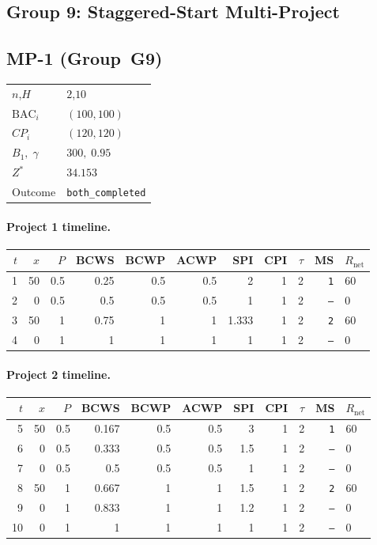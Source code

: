 \documentclass[12pt, a4paper]{article}
\newcommand{\BAC}{\mathrm{BAC}}
\begin{document}
\newpage


\subsection*{Group 9: Staggered-Start Multi-Project}

\subsection*{MP-1  (Group~G9)}
\begin{center}
\begin{tabular}{ll}
\toprule
$n$,\;$H$ & $2$,\;$10$ \\
$\BAC_i$ & $(100, 100)$ \\
$CP_i$   & $(120, 120)$ \\
$B_1,\;\gamma$ & $300,\;0.95$ \\
$Z^*$ & $34.153$ \\
Outcome & \texttt{both_completed} \\
\bottomrule
\end{tabular}
\end{center}

\paragraph{Project 1 timeline.}
\begin{center}
\begin{tabular}{rrrrrrrrrrl}
\toprule
$t$ & $x$ & $P$ & BCWS & BCWP & ACWP & SPI & CPI & $\tau$ & MS & $R_{\mathrm{net}}$\\
\midrule
1 & 50 & 0.5 & 0.25 & 0.5 & 0.5 & 2 & 1 & 2 & \texttt{1} & 60 \\
2 & 0 & 0.5 & 0.5 & 0.5 & 0.5 & 1 & 1 & 2 & \texttt{---} & 0 \\
3 & 50 & 1 & 0.75 & 1 & 1 & 1.333 & 1 & 2 & \texttt{2} & 60 \\
4 & 0 & 1 & 1 & 1 & 1 & 1 & 1 & 2 & \texttt{---} & 0 \\
\bottomrule
\end{tabular}
\end{center}
\paragraph{Project 2 timeline.}
\begin{center}
\begin{tabular}{rrrrrrrrrrl}
\toprule
$t$ & $x$ & $P$ & BCWS & BCWP & ACWP & SPI & CPI & $\tau$ & MS & $R_{\mathrm{net}}$\\
\midrule
5 & 50 & 0.5 & 0.167 & 0.5 & 0.5 & 3 & 1 & 2 & \texttt{1} & 60 \\
6 & 0 & 0.5 & 0.333 & 0.5 & 0.5 & 1.5 & 1 & 2 & \texttt{---} & 0 \\
7 & 0 & 0.5 & 0.5 & 0.5 & 0.5 & 1 & 1 & 2 & \texttt{---} & 0 \\
8 & 50 & 1 & 0.667 & 1 & 1 & 1.5 & 1 & 2 & \texttt{2} & 60 \\
9 & 0 & 1 & 0.833 & 1 & 1 & 1.2 & 1 & 2 & \texttt{---} & 0 \\
10 & 0 & 1 & 1 & 1 & 1 & 1 & 1 & 2 & \texttt{---} & 0 \\
\bottomrule
\end{tabular}
\end{center}
\end{document}
